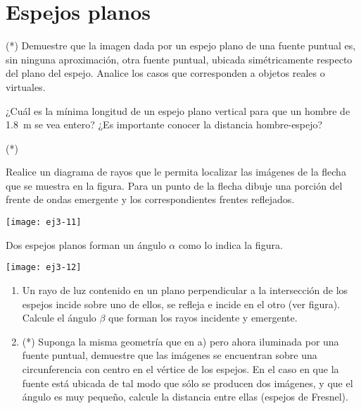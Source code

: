 \section*{Espejos planos}

\item (*) Demuestre que la imagen dada por un espejo plano de una fuente puntual es, sin ninguna aproximación, otra fuente puntual, ubicada simétricamente respecto del plano del espejo.
Analice los casos que corresponden a objetos reales o virtuales.


\item ¿Cuál es la mínima longitud de un espejo plano vertical para que un hombre de \SI{1.8}{\metre} se vea entero?
¿Es importante conocer la distancia hombre-espejo? 


\item (*)
\begin{minipage}[t][1.5cm]{0.8\textwidth}
Realice un diagrama de rayos que le permita localizar las imágenes de la flecha que se muestra en la figura.
Para un punto de la flecha dibuje una porción del frente de ondas emergente y los correspondientes frentes reflejados.
\end{minipage}
\begin{minipage}[c][0.6cm][t]{0.1\textwidth}
	\texttt{[image: ej3-11]}
\end{minipage}



\item
\begin{minipage}[t][0cm]{0.65\textwidth}
Dos espejos planos forman un ángulo $\alpha$ como lo indica la figura.
\end{minipage}
\begin{minipage}[c][1.5cm][t]{0.3\textwidth}
	\texttt{[image: ej3-12]}
\end{minipage}
\begin{enumerate}
	\item Un rayo de luz contenido en un plano perpendicular a la intersección de los espejos incide sobre uno de ellos, se refleja e incide en el otro (ver figura).
	Calcule el ángulo \(\beta\) que forman los rayos incidente y emergente.
	\item (*) Suponga la misma geometría que en a) pero ahora iluminada por una fuente puntual, demuestre que las imágenes se encuentran sobre una circunferencia con centro en el vértice de los espejos.
	En el caso en que la fuente está ubicada de tal modo que sólo se producen dos imágenes, y que el ángulo es muy pequeño, calcule la distancia entre ellas (espejos de Fresnel).
\end{enumerate}
